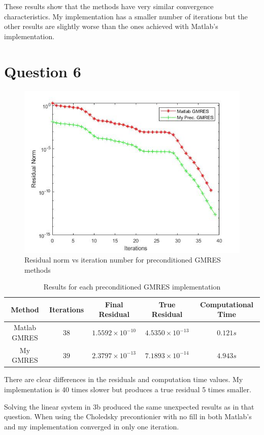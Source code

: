\documentclass[a4paper, 11pt]{article}
\begin{document}
			These results show that the methods have very similar convergence characteristics.
			My implementation has a smaller number of iterations but the other results are slightly worse than the ones achieved with Matlab's implementation.
			
		
		\section*{Question 6}
			\begin{figure}[H]
				\centering
				\includegraphics[width=.6\linewidth]{ex6.jpg}
				\caption{Residual norm vs iteration number for preconditioned GMRES methods}
				\label{fig:ex6}
			\end{figure}
			
			\begin{table}[H]
				\centering
				\begin{tabular}{c|c|c|c|c}
					\textbf{Method} &  \textbf{Iterations} 	& \textbf{Final Residual} 	 & \textbf{True Residual}		& \textbf{Computational Time} 	\\ \hline
					Matlab GMRES	& 			$38$ 		& $ 1.5592 \times 10^{-10} $ & $ 4.5350 \times 10^{-13} $	& $ 0.121 s $	\\ \hline
					My GMRES		& 			$39$ 		& $ 2.3797 \times 10^{-13} $ & $ 7.1893 \times 10^{-14} $	& $ 4.943 s $	\\ 
				\end{tabular}
				\caption{Results for each preconditioned GMRES implementation}
				\label{table:ex6}
			\end{table}
			
			There are clear differences in the residuals and computation time values.
			My implementation is 40 times slower but produces a true residual 5 times smaller.		
		
		
		Solving the linear system in 3b produced the same unexpected results as in that question.
		When using the Choledsky precontionier with no fill in both Matlab's and my implementation converged in only one iteration.
		
\end{document}
